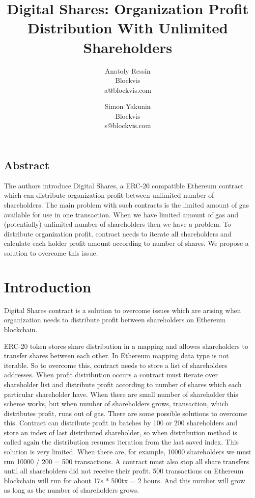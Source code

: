\documentclass[onecolumn]{article}
\begin{document}
\title{Digital Shares: Organization Profit Distribution With Unlimited Shareholders}

\author{
{\rm Anatoly Ressin}\\
Blockvis\\
a@blockvis.com
\and
{\rm Simon Yakunin}\\
Blockvis\\
s@blockvis.com
}

\maketitle

\subsection*{Abstract}
The authors introduce Digital Shares, a ERC-20  compatible Ethereum contract which can distribute organization profit between unlimited number of shareholders. The main problem with such contracts is the limited amount of gas available for use in one transaction. When we have limited amount of gas and (potentially) unlimited number of shareholders then we have a problem. To distribute organization profit, contract needs to iterate all shareholders and calculate each holder profit amount according to number of shares. We propose a solution to overcome this issue.

\section{Introduction}
Digital Shares contract is a solution to overcome issues which are arising when organization needs to distribute profit between shareholders on Ethereum \cite{ethereum} blockchain.

ERC-20 \cite{erc20} token stores share distribution in a mapping and allowes shareholders to transfer shares between each other. In Ethereum mapping data type is not iterable. So to overcome this, contract needs to store a list of shareholders addresses. When profit distribution occurs a contract must iterate over shareholder list and distribute profit according to number of shares which each particular shareholder have. When there are small number of shareholder this scheme works, but when number of shareholders grows, transaction, which distributes profit, runs out of gas. There are some possible solutions to overcome this. Contract can distribute profit in batches by 100 or 200 shareholders and store an index of last distributed shareholder, so when distribution method is called again the distribution resumes iteration from the last saved index. This solution is very limited. When there are, for example, 10000 shareholders we must run 10000 / 200 = 500 transactions. A contract must also stop all share transfers until all shareholders did not receive their profit. 500 transactions on Ethereum blockchain will run for about 17s * 500tx = 2 hours. And this number will grow as long as the number of shareholders grows.
\end{document}
